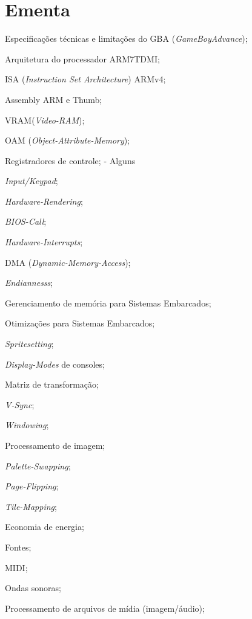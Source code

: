 \documentclass{article}
\begin{document}
\section{Ementa}
\begin{itemize*}[label={}]
    \item Especificações técnicas e limitações do GBA (\textit{GameBoyAdvance});
    \item Arquitetura do processador ARM7TDMI\@;
    \item ISA (\textit{Instruction Set Architecture}) ARMv4;
    \item Assembly ARM e Thumb;
    \item VRAM\@ (\textit{Video-RAM});
    \item OAM (\textit{Object-Attribute-Memory});
    \item Registradores de controle;  - Alguns
    \item \textit{Input/Keypad};
    \item \textit{Hardware-Rendering};
    \item \textit{BIOS-Call};
    \item \textit{Hardware-Interrupts};
    \item DMA (\textit{Dynamic-Memory-Access});
    \item \textit{Endiannesss};
    \item Gerenciamento de memória para Sistemas Embarcados;
    \item Otimizações para Sistemas Embarcados;
    \item \textit{Spritesetting};
    \item \textit{Display-Modes} de consoles;
    \item Matriz de transformação;
    \item \textit{V-Sync};
    \item \textit{Windowing};
    \item Processamento de imagem;
    \item \textit{Palette-Swapping};
    \item \textit{Page-Flipping};
    \item \textit{Tile-Mapping};
    \item Economia de energia;
    \item Fontes;
    \item MIDI\@;
    \item Ondas sonoras;
    \item Processamento de arquivos de mídia (imagem/áudio);
\end{itemize*}
\end{document}
